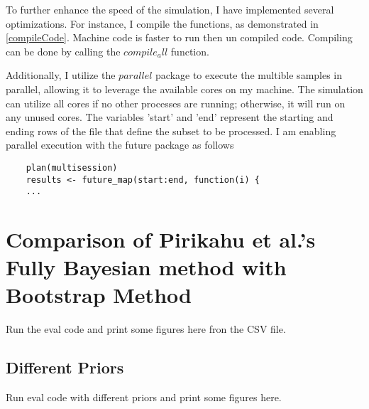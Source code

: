 To further enhance the speed of the simulation, I have implemented several optimizations. For instance, I compile the functions, as demonstrated in \ref{compileCode}. Machine code is faster to run then un compiled code. Compiling can be done by calling the $compile_all$ function.

Additionally, I utilize the $parallel$ package to execute the multible samples in parallel, allowing it to leverage the available cores on my machine. The simulation can utilize all cores if no other processes are running; otherwise, it will run on any unused cores. The variables 'start' and 'end' represent the starting and ending rows of the file that define the subset to be processed. I am enabling parallel execution with the future package as follows

\begin{lstlisting}
    plan(multisession)
    results <- future_map(start:end, function(i) {
    ...
\end{lstlisting}

\section{Comparison of Pirikahu et al.'s Fully Bayesian method with Bootstrap Method}
Run the eval code and print some figures here fron the CSV file.

\subsection{Different Priors}
Run eval code with different priors and print some figures here.